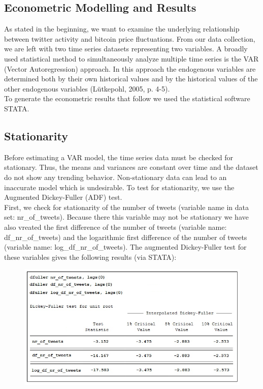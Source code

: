 \documentclass[a4paper,american,12pt]{article}
\begin{document}
\begin{spacing}{1.2}
\section{Econometric Modelling and Results}
\label{sec:EconometricModellingandResults}
As stated in the beginning, we want to examine the underlying relationship between twitter activity and bitcoin price fluctuations. From our data collection, we are left with two time series datasets representing two variables. A broadly used statistical method to simultaneously analyze multiple time series is the VAR (Vector Autoregression) approach. In this approach the endogenous variables are determined both by their own historical values and by the historical values of the other endogenous variables (Lütkepohl, 2005, p. 4-5).\\
To generate the econometric results that follow we used the statistical software STATA.

\subsection{Stationarity}
Before estimating a VAR model, the time series data must be checked for stationary. Thus, the means and variances are constant over time and the dataset do not show any trending behavior. Non-stationary data can lead to an inaccurate model which is undesirable. To test for stationarity, we use the Augmented Dickey-Fuller (ADF) test.\\
First, we check for stationarity of the number of tweets (variable name in data set: nr\_of\_tweets). Because there this variable may not be stationary we have also vreated the first difference of the number of tweets (variable name: df\_nr\_of\_tweets) and the logarithmic first difference of the number of tweets (variable name: log\_df\_nr\_of\_tweets). The augmented Dickey-Fuller test for these variables gives the following results (via STATA):\\

\begin{figure}[H]
\centering
\graphicspath{ {stata_export_graphs/} }
\includegraphics[scale=0.85]{ADF_twitter_variables.png}
\end{figure}
	

\end{spacing}
\end{document}
